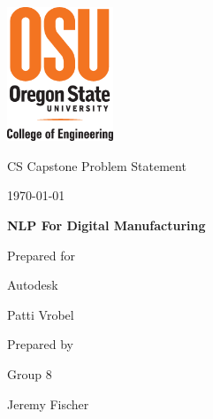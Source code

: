 \documentclass[onecolumn, draftclsnofoot,10pt, compsoc]{IEEEtran}
\def \CapstoneTeamNumber{		8}
\def \GroupMemberOne{			Jeremy Fischer}
\def \CapstoneProjectName{		NLP For Digital Manufacturing}
\def \CapstoneSponsorCompany{	Autodesk}
\def \CapstoneSponsorPerson{		Patti Vrobel}
\def \DocType{		Problem Statement
				}
\newcommand{\NameSigPair}[1]{\par
\makebox[2.75in][r]{#1} \hfil 	\makebox[3.25in]{\makebox[2.25in]{\hrulefill} \hfill		\makebox[.75in]{\hrulefill}}
\par\vspace{-12pt} \textit{\tiny\noindent
\makebox[2.75in]{} \hfil		\makebox[3.25in]{\makebox[2.25in][r]{Signature} \hfill	\makebox[.75in][r]{Date}}}}
\renewcommand{\NameSigPair}[1]{#1}
\begin{document}
\begin{titlepage}
    \begin{singlespace}
    	\includegraphics[height=4cm]{coe_v_spot1}
        \par\vspace{.2in}
        \centering
        \scshape{
            \huge CS Capstone \DocType \par
            {\large\today}\par
            \vspace{.5in}
            \textbf{\Huge\CapstoneProjectName}\par
            \vfill
            {\large Prepared for}\par
            \Huge \CapstoneSponsorCompany\par
            \vspace{5pt}
            {\Large\NameSigPair{\CapstoneSponsorPerson}\par}
            {\large Prepared by }\par
            Group\CapstoneTeamNumber\par
            \vspace{5pt}
            {\Large
                \NameSigPair{\GroupMemberOne}\par
            }
            \vspace{20pt}
        }
        \begin{abstract}

\end{abstract}
\end{singlespace}
\end{titlepage}
\end{document}
